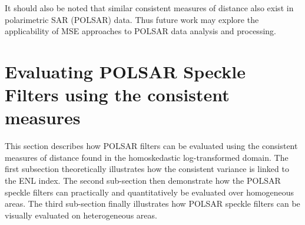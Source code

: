 It should also be noted that similar consistent measures of distance also exist in polarimetric SAR (POLSAR) data. 
Thus future work may explore the applicability of MSE approaches to POLSAR data analysis and processing.

\afterpage{\clearpage}




\section{Evaluating POLSAR Speckle Filters using the consistent measures}

This section describes how POLSAR filters can be evaluated
  using the consistent measures of distance found in the homoskedastic log-transformed domain.
The first subsection theoretically illustrates how the consistent variance is linked to the ENL index.
The second sub-section then demonstrate how the POLSAR speckle filters can practically and quantitatively be evaluated over homogeneous areas.
The third sub-section finally illustrates how POLSAR speckle filters can be visually evaluated on heterogeneous areas.

